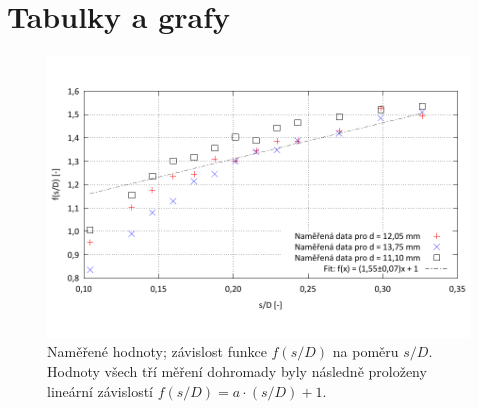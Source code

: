 \documentclass[english]{article}
\begin{document}
\section{Tabulky a grafy}

	\begin{figure}[h!]
	\begin{center}
	    \vspace*{-1cm}
		\includegraphics[width=\linewidth]{../gnuplot/pruraz.pdf}
	    \vspace*{-2cm}
		\caption{Naměřené hodnoty; závislost funkce $f(s/D)$ na poměru $s/D$. Hodnoty všech tří měření dohromady byly následně proloženy lineární závislostí $f(s/D) = a\cdot (s/D) + 1$.}
		\label{fig:g_pruraz}
	\end{center}
	\end{figure}
\clearpage
\end{document}
